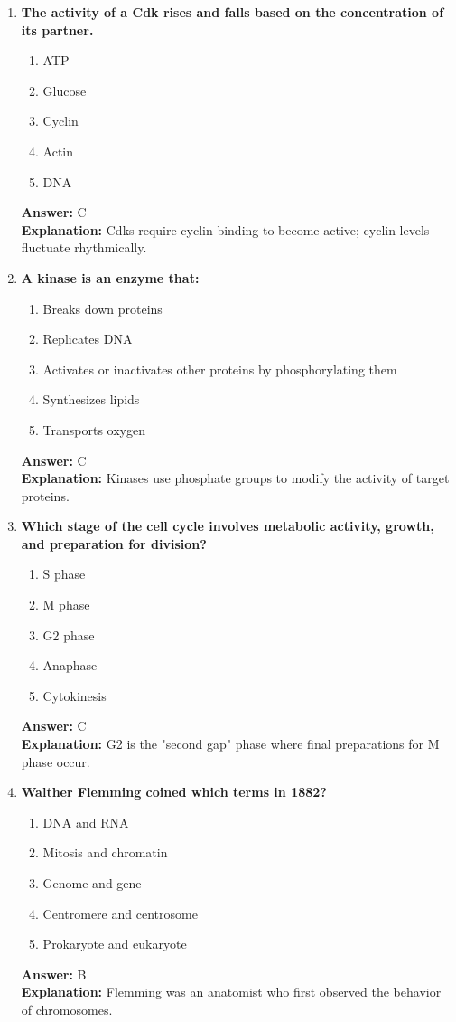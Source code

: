 \documentclass[11pt, a4paper]{article}
\begin{document}
\begin{enumerate}[leftmargin=*, label=\arabic*.]
\item \textbf{The activity of a Cdk rises and falls based on the concentration of its \underline{\hspace{1cm}} partner.}
\begin{enumerate}[label=\Alph*.]
\item ATP
\item Glucose
\item Cyclin
\item Actin
\item DNA
\end{enumerate}
\textbf{Answer:} C \\
\textbf{Explanation:} Cdks require cyclin binding to become active; cyclin levels fluctuate rhythmically.

\item \textbf{A kinase is an enzyme that:}
\begin{enumerate}[label=\Alph*.]
\item Breaks down proteins
\item Replicates DNA
\item Activates or inactivates other proteins by phosphorylating them
\item Synthesizes lipids
\item Transports oxygen
\end{enumerate}
\textbf{Answer:} C \\
\textbf{Explanation:} Kinases use phosphate groups to modify the activity of target proteins.

\item \textbf{Which stage of the cell cycle involves metabolic activity, growth, and preparation for division?}
\begin{enumerate}[label=\Alph*.]
\item S phase
\item M phase
\item G2 phase
\item Anaphase
\item Cytokinesis
\end{enumerate}
\textbf{Answer:} C \\
\textbf{Explanation:} G2 is the "second gap" phase where final preparations for M phase occur.

\item \textbf{Walther Flemming coined which terms in 1882?}
\begin{enumerate}[label=\Alph*.]
\item DNA and RNA
\item Mitosis and chromatin
\item Genome and gene
\item Centromere and centrosome
\item Prokaryote and eukaryote
\end{enumerate}
\textbf{Answer:} B \\
\textbf{Explanation:} Flemming was an anatomist who first observed the behavior of chromosomes.


\end{enumerate}
\end{document}
